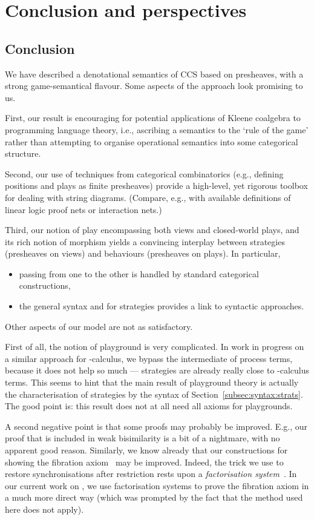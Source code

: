 \documentclass{LMCS}
\theoremstyle{plain}\newtheorem{satz}[thm]{Satz}
\begin{document}
\section{Conclusion and perspectives}\label{sec:conc}

\subsection{Conclusion}
We have described a denotational semantics of CCS based on presheaves,
with a strong game-semantical flavour. Some aspects of the approach
look promising to us. 

First, our result is encouraging for potential applications of Kleene
coalgebra to programming language theory, i.e., ascribing a semantics
to the `rule of the game' rather than attempting to organise
operational semantics into some categorical structure.

Second, our use of techniques from categorical combinatorics (e.g.,
defining positions and plays as finite presheaves) provide a
high-level, yet rigorous toolbox for dealing with string diagrams.
(Compare, e.g., with available definitions of linear logic proof nets
or interaction nets.)

Third, our notion of play encompassing both views and closed-world
plays, and its rich notion of morphism yields a convincing interplay
between strategies (presheaves on views) and behaviours (presheaves on
plays). In particular,
\begin{itemize}
\item passing from one to the other
is handled by standard categorical constructions,
\item the general syntax and \lts{} for strategies provides a link to
  syntactic approaches.
\end{itemize}

Other aspects of our model are not as satisfactory.

First of all, the notion of playground is very complicated.  In work
in progress on a similar approach for -calculus, we bypass the
intermediate \lts{}  of process terms, because it does not help so
much ---  strategies are already really close to -calculus
terms.  This seems to hint that the main result of playground theory
is actually the characterisation of strategies by the syntax of
Section~\ref{subsec:syntax:strats}. The good point is: this result
does not at all need all axioms for playgrounds.

A second negative point is that some proofs may probably be improved.
E.g., our proof that  is included
in weak bisimilarity is a bit of a nightmare, with no apparent good
reason.  Similarly, we know already that our constructions for showing
the fibration axiom~ may be improved. Indeed, the
trick we use to restore synchronisations after restriction rests upon
a \emph{factorisation system}~\cite{FK,Joyal:ncatlab:facto}.  In our
current work on , we use factorisation systems to prove the
fibration axiom in a much more direct way (which was prompted by the
fact that the method used here does not apply).
 
\end{document}
